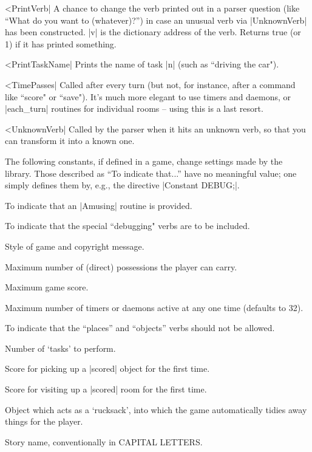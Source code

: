 {{{^^|PrintVerb|
A chance to change the verb printed out in a parser question (like ``What do
you want to (whatever)?'') in case an unusual verb via |UnknownVerb| has
been constructed.  |v| is the dictionary address of the verb.
Returns true (or 1) if it has printed something.

^^|PrintTaskName|
Prints the name of task |n| (such as ``driving the car").

^^|TimePasses|
Called after every turn (but not, for instance, after a command like
``score" or ``save").  It's much more elegant to use timers and daemons, or
|each_turn| routines for individual rooms -- using this is a last resort.

^^|UnknownVerb|
Called by the parser when it hits an unknown verb,
so that you can transform it into a known one.

\bigskip\noindent
The following constants, if defined in a game, change settings made by the
library.  Those described as ``To indicate that...'' have no meaningful
value; one simply defines them by, e.g., the directive |Constant DEBUG;|.

\bigskip\stepin=90pt

To indicate that an |Amusing| routine is provided.

To indicate that the special ``debugging" verbs are to be
included.

Style of game and copyright message.

Maximum number of (direct) possessions the player can
carry.

Maximum game score.

Maximum number of timers or daemons active at any one time
(defaults to 32).

To indicate that the ``places'' and ``objects'' verbs
should not be allowed.

Number of `tasks' to perform.

Score for picking up a |scored| object for the first
time.

Score for visiting up a |scored| room for the first time.

Object which acts as a `rucksack', into which the game
automatically tidies away things for the player.

Story name, conventionally in CAPITAL LETTERS.

}}}
